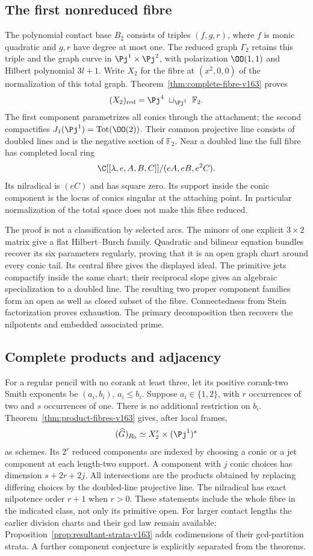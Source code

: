 \subsection{The first nonreduced fibre}
The polynomial contact base $B_2$ consists of triples $(f,g,r)$,
where $f$ is monic quadratic and $g,r$ have degree at most one.
The reduced graph $\Gamma_2$ retains this triple and the graph
curve in $\Pj^1\times\Pj^2$, with polarization $\OO(1,1)$ and
Hilbert polynomial $3l+1$. Write $X_2$ for the fibre at
$(x^2,0,0)$ of the normalization of this total graph.
Theorem~\ref{thm:complete-fibre-v163} proves
\[
 (X_2)_{\rm red}=\Pj^4\ \cup_{\Pj^1}\ \mathbb F_2.
\]
The first component parametrizes all conics through the attachment;
the second compactifies $J_1(\Pj^1)=\operatorname{Tot}(\OO(2))$.
Their common projective line consists of doubled lines and is the
negative section of $\mathbb F_2$. Near a doubled line the full
fibre has completed local ring
\[
 \C[[\lambda,e,A,B,C]]/(eA,eB,e^2C).
\]
Its nilradical is $(eC)$ and has square zero. Its support inside the
conic component is the locus of conics singular at the attaching
point. In particular normalization of the total space does not
make this fibre reduced.

The proof is not a classification by selected arcs. The minors of
one explicit $3\times2$ matrix give a flat Hilbert--Burch family.
Quadratic and bilinear equation bundles recover its six parameters
regularly, proving that it is an open graph chart around every
conic tail. Its central fibre gives the displayed ideal. The
primitive jets compactify inside the same chart; their reciprocal
slope gives an algebraic specialization to a doubled line.
The resulting two proper component families form an open as well
as closed subset of the fibre. Connectedness from Stein
factorization proves exhaustion. The primary decomposition then
recovers the nilpotents and embedded associated prime.

\subsection{Complete products and adjacency}
For a regular pencil with no corank at least three, let its
positive corank-two Smith exponents be $(a_i,b_i)$, $a_i\leq b_i$.
Suppose $a_i\in\{1,2\}$, with $r$ occurrences of two and $s$
occurrences of one. There is no additional restriction on $b_i$.
Theorem~\ref{thm:product-fibres-v163} gives, after local frames,
\[
             (\widehat G)_{R_0}\simeq X_2^r\times(\Pj^1)^s
\]
as schemes. Its $2^r$ reduced components are indexed by choosing a
conic or a jet component at each length-two support. A component
with $j$ conic choices has dimension $s+2r+2j$. All intersections
are the products obtained by replacing differing choices by the
doubled-line projective line. The nilradical has exact nilpotence
order $r+1$ when $r>0$. These statements include the whole fibre
in the indicated class, not only its primitive open. For larger
contact lengths the earlier division charts and their gcd law
remain available; Proposition~\ref{prop:resultant-strata-v163}
adds codimensions of their gcd-partition strata. A further
component conjecture is explicitly separated from the theorems.

